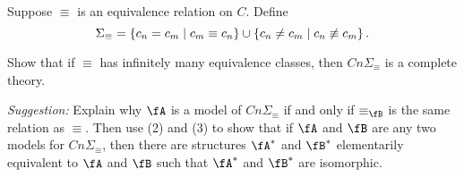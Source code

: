 \begin{problem}
  Suppose $\equiv$ is an equivalence relation on $C$. Define
  \[ \Sigma_\equiv = \left\{ c_n = c_m \mid c_m \equiv c_n\right\}
      \cup \left\{c_n \ne c_m \mid c_n \not\equiv c_m \right\}. \]

  Show that if $\equiv$ has infinitely many equivalence classes, then
  $Cn \Sigma_\equiv$ is a complete theory.

  \emph{Suggestion: } Explain why $\fA$ is a model of $Cn \Sigma_\equiv$
  if and only if $\equiv_\fB$ is the same relation as $\equiv$.
  Then use (2) and (3) to show that if $\fA$ and $\fB$ are
  any two models for $Cn \Sigma_\equiv$, then there are structures
  $\fA^*$ and $\fB^*$ elementarily equivalent to $\fA$ and $\fB$
  such that $\fA^*$ and $\fB^*$ are isomorphic.
\end{problem}
\begin{Answer}

\end{Answer}
